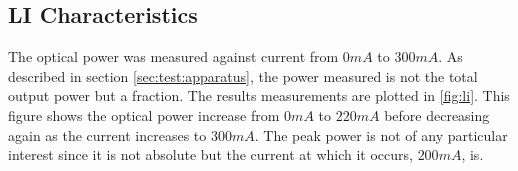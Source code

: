 \subsection{LI Characteristics}
\label{sec:test:li}

%



The optical power was measured against current from $0mA$ to $300mA$. As described in section \ref{sec:test:apparatus}, the power measured is not the total output power but a fraction. The results measurements are plotted in \ref{fig:li}. This figure shows the optical power increase from $0mA$ to $220mA$ before decreasing again as the current increases to $300mA$. The peak power is not of any particular interest since it is not absolute but the current at which it occurs, $200mA$, is.

